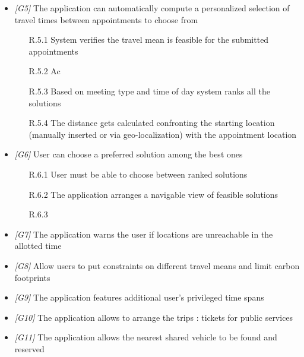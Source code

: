 \begin{itemize}
\begin{itemize}
                  \end{itemize}

\item \textit{[G5]} The application can automatically compute a personalized selection of travel times between appointments to choose from

                  \begin{itemize}
                        \item [R.5.1] System verifies the travel mean is feasible for the submitted appointments
                        \item [R.5.2] Ac
                        \item [R.5.3] Based on meeting type and time of day system ranks all the solutions
                        \item [R.5.4] The distance gets calculated confronting the starting location (manually inserted or via geo-localization) with the appointment location
                  \end{itemize}
                  
\item \textit{[G6]} User can choose a preferred solution among the best ones 

                   \begin{itemize}
                        \item [R.6.1] User must be able to choose between ranked solutions
                        \item [R.6.2] The application arranges a navigable view of feasible solutions
                        \item [R.6.3] 
                  \end{itemize}
                  
\item \textit{[G7]} The application warns the user if locations are unreachable in the allotted time 

\item \textit{[G8]} Allow users to put constraints on different travel means and limit carbon footprints

\item \textit{[G9]} The application features additional user’s privileged time spans 

\item \textit{[G10]} The application allows to arrange the trips : tickets for public services

\item \textit{[G11]} The application allows the nearest shared vehicle to be found and reserved


\end{itemize}

